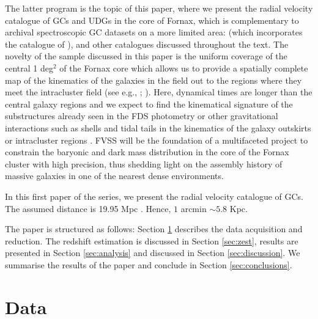 \documentclass[usenatbib]{mnras}
\begin{document}
The latter program is the topic of this paper, where we present the radial
velocity catalogue of GCs and UDGs in the core of Fornax, which is
complementary to archival spectroscopic GC datasets on a more limited area:
\citet{Schuberth} (which incorporates the catalogue of \citealt{Dirsch04}),
\citet{Bergond07} and other catalogues discussed throughout the
text. The novelty of the sample discussed in this paper is the uniform coverage
of the central 1 deg$^2$ of the Fornax core which allows us to provide a
spatially complete map of the kinematics of the galaxies in the field out to
the regions where they meet the intracluster field (see e.g., \citealt{napolitano03};
\citealt{arnaboldi12}). Here, dynamical times are longer than the central
galaxy regions and we expect to find the kinematical signature of the
substructures already seen in the FDS photometry \citep{Iodice16} or other
gravitational interactions such as shells and tidal tails in the kinematics of
the galaxy outskirts or intracluster regions
\citep{napolitano02,napolitano03, murante07, bullock05, rudick06, duc11, Longobardi15}.
FVSS will be the foundation of a multifaceted project to constrain the baryonic and dark
mass distribution in the core of the Fornax cluster with high precision, thus
shedding light on the assembly history of massive galaxies in one of the
nearest dense environments.

In this first paper of the series, we present the radial velocity catalogue of GCs.
The assumed distance is 19.95 Mpc \citep{Tonry01}. Hence, $1$ arcmin $\sim 5.8$ Kpc.

The paper is structured as follows: Section \ref{sec:data} describes the data
acquisition and reduction. The redshift estimation is discussed in Section
\ref{sec:zest}, results are presented in Section \ref{sec:analysis} and
discussed in Section \ref{sec:discussion}. We summarise the results of the paper and
conclude in Section \ref{sec:conclusions}.

\section{Data}
\label{sec:data}
\end{document}

